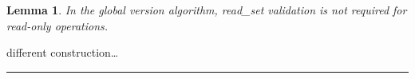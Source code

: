 \documentclass{article}
\newtheorem{lemma}[theorem]{Lemma}
\newenvironment{proof}[1][Proof]{\begin{trivlist}
\item[\hskip \labelsep {\bfseries #1}]}{\qedsymb\end{trivlist}}
\newcommand{\qedsymb}{\hfill{\rule{2mm}{2mm}}}
\newcommand{\code}[1]{\textsf{#1}}
\newcommand{\readSet}{\code{read\_set}\xspace}
\begin{document}
\begin{lemma}
In the global version algorithm, \readSet validation is not required
for read-only operations. 
\end{lemma}
\begin{proof}
different construction\ldots
\end{proof}




\end{document}
